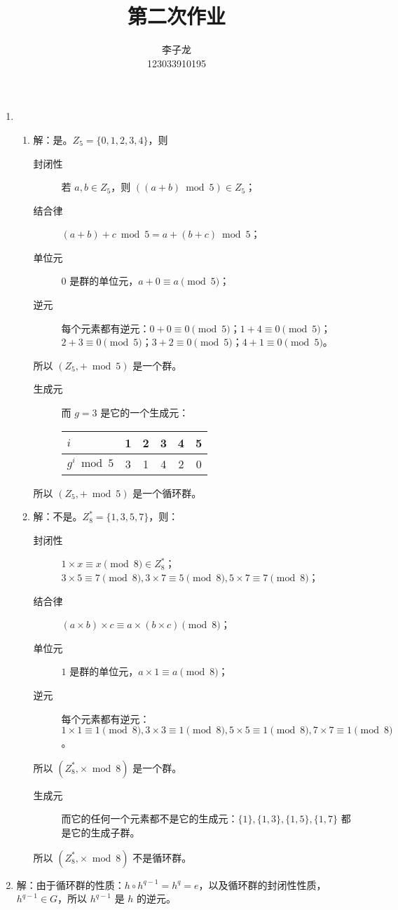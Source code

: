\documentclass{sjtuarticle}
\title{第二次作业}
\author{李子龙\\123033910195}
\begin{document}
\maketitle
\begin{enumerate}
    \item 
    \begin{enumerate}
        \item 解：是。$Z_5=\{0,1,2,3,4\}$，则
        \begin{description}
            \item[封闭性] 若 $a,b\in Z_5$，则 $((a+b)\bmod 5)\in Z_5$；
            \item[结合律] $(a+b)+c \bmod 5 = a+(b+c) \bmod 5$；
            \item[单位元] $0$ 是群的单位元，$a+0\equiv a\pmod{5}$；
            \item[逆元] 每个元素都有逆元：$0+0\equiv 0\pmod{5}$；$1+4\equiv 0\pmod{5}$；$2+3\equiv 0\pmod{5}$；$3+2\equiv 0\pmod{5}$；$4+1\equiv 0\pmod{5}$。
        \end{description}
        所以 $(Z_5, +\bmod 5)$ 是一个群。
        \begin{description}
            \item[生成元] 而 $g=3$ 是它的一个生成元：

            \begin{tabular}{l|c|c|c|c|c}
                $i$            & 1 & 2 & 3 & 4 & 5 \\
                \hline
                $g^i \bmod 5$  & 3 & 1 & 4 & 2 & 0 \\
            \end{tabular}
        \end{description}
        所以 $(Z_5, +\bmod 5)$ 是一个循环群。
        \item 解：不是。$Z_8^*=\{1,3,5,7\}$，则：
        \begin{description}
            \item[封闭性] $1\times x\equiv x \pmod{8}\in Z_8^*$；$3\times 5\equiv 7\pmod{8}, 3\times 7\equiv 5\pmod{8}, 5\times 7\equiv 7\pmod{8}$；
            \item[结合律] $(a\times b)\times c\equiv a\times (b\times c)\pmod{8}$；
            \item[单位元] $1$ 是群的单位元，$a\times 1 \equiv a\pmod{8}$；
            \item[逆元] 每个元素都有逆元：$1\times 1 \equiv 1\pmod{8}, 3\times 3\equiv 1\pmod{8}, 5\times 5\equiv 1\pmod{8}, 7\times 7\equiv 1\pmod{8}$。  
        \end{description}
        所以 $(Z_8^*,\times \bmod 8)$ 是一个群。
        \begin{description}
            \item[生成元] 而它的任何一个元素都不是它的生成元：$\{1\},\{1,3\},\{1,5\},\{1,7\}$ 都是它的生成子群。
        \end{description}
        所以 $(Z_8^*,\times \bmod 8)$ 不是循环群。
    \end{enumerate}
    \item 解：由于循环群的性质：$h\circ h^{q-1}=h^q=e$，以及循环群的封闭性性质，$h^{q-1}\in G$，所以 $h^{q-1}$ 是 $h$ 的逆元。
    

\end{enumerate}
\end{document}
